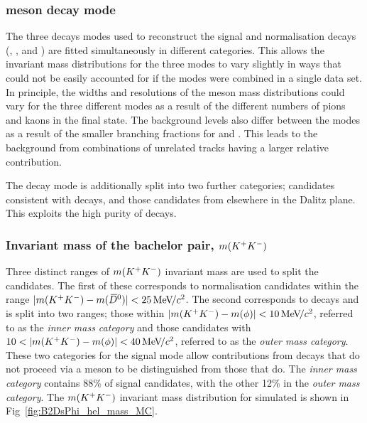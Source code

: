 \subsubsection{\Dsp meson decay mode} 
The three \Dsp decays modes used to reconstruct the signal and normalisation decays (\decay{\Dsp}{\Kp\Km\pip}, \decay{\Dsp}{\pip\pim\pip}, and \decay{\Dsp}{\Kp\pim\pip}) are fitted simultaneously in different categories. This allows the invariant mass distributions for the three modes to vary slightly in ways that could not be easily accounted for if the modes were combined in a single data set. In principle, the widths and resolutions of the \Bp meson mass distributions could vary for the three different modes as a result of the different numbers of pions and kaons in the final state. The background levels also differ between the modes as a result of the smaller branching fractions for \decay{\Dsp}{\pip\pim\pip} and \decay{\Dsp}{\Kp\pim\pip}. This leads to the background from combinations of unrelated tracks having a larger relative contribution.

The \decay{\Dsp}{\Kp\Km\pip} decay mode is additionally split into two further categories; candidates consistent with \decay{\Dsp}{\phiz\pip} decays, and those candidates from elsewhere in the \decay{\Dsp}{\Kp\Km\pip} Dalitz plane. This exploits the high purity of \decay{\Dsp}{\phiz\pip} decays. 

\subsubsection{Invariant mass of the bachelor \Kp\Km pair, $m({{K}^+}{{K}^-})$} 
Three distinct ranges of $m({{K}^+}{{K}^-})$ invariant mass are used to split the candidates. The first of these corresponds to normalisation \decay{\Bp}{\Dsp\Dzb} candidates within the range $|m({{K}^+}{{K}^-})-m({{\kern 0.2em\overline{\kern -0.2em D}{}}{}^0})|<25 {\mathrm{\,Me\kern -0.1em V\!/}c^2}$. The second corresponds to \decay{\Bp}{\Dsp\phiz} decays and is split into two ranges; those within $|m({{K}^+}{{K}^-})-m(\phi)|<10{\mathrm{\,Me\kern -0.1em V\!/}c^2}$, referred to as the \emph{inner \phiz mass category} and those candidates with $10<|m(\Kp\Km)-m(\phiz)|<40\mevcc$, referred to as the \emph{outer \phiz mass category}. These two categories for the signal mode allow contributions from decays that do not proceed via a \phiz meson to be distinguished from those that do. The \emph{inner \phiz mass category} contains 88\% of signal \decay{\Bp}{\Dsp\phiz} candidates, with the other 12\% in the \emph{outer \phiz mass category}. The $m({{K}^+}{{K}^-})$ invariant mass distribution for simulated \decay{\Bp}{\Dsp\phiz} is shown in Fig~\ref{fig:B2DsPhi_hel_mass_MC}.



